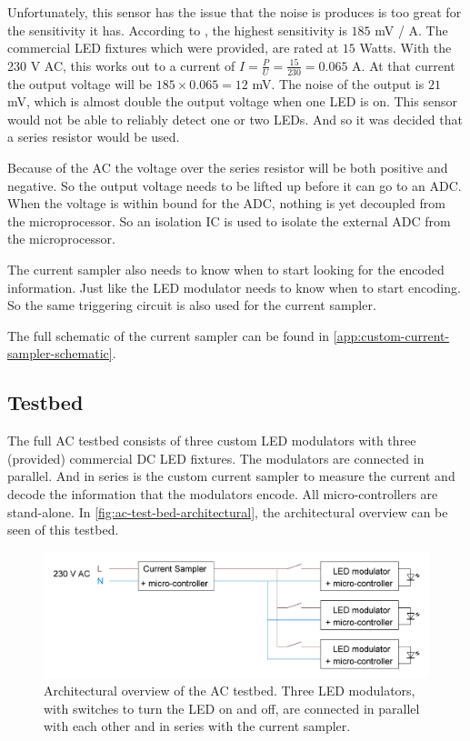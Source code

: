 Unfortunately, this sensor has the issue that the noise is produces is too great for the sensitivity it has.
According to \cite{hall-ac-current-sensor-datasheet}, the highest sensitivity is $185$ mV / A.
The commercial LED fixtures which were provided, are rated at $15$ Watts.
With the 230 V AC, this works out to a current of $I = \frac{P}{U} = \frac{15}{230} = 0.065$ A.
At that current the output voltage will be $185 \times 0.065 = 12$ mV.
The noise of the output is $21$ mV, which is almost double the output voltage when one LED is on.
This sensor would not be able to reliably detect one or two LEDs.
And so it was decided that a series resistor would be used.

Because of the AC the voltage over the series resistor will be both positive and negative.
So the output voltage needs to be lifted up before it can go to an ADC.
When the voltage is within bound for the ADC, nothing is yet decoupled from the microprocessor.
So an isolation IC is used to isolate the external ADC from the microprocessor.

The current sampler also needs to know when to start looking for the encoded information.
Just like the LED modulator needs to know when to start encoding.
So the same triggering circuit is also used for the current sampler.

The full schematic of the current sampler can be found in \autoref{app:custom-current-sampler-schematic}.





\subsection{Testbed}

The full AC testbed consists of three custom LED modulators with three (provided) commercial DC LED fixtures.
The modulators are connected in parallel. 
And in series is the custom current sampler to measure the current and decode the information that the modulators encode.
All micro-controllers are stand-alone.
In \autoref{fig:ac-test-bed-architectural}, the architectural overview can be seen of this testbed.

\begin{figure}[htb]
	\centering
	\includegraphics[angle=0,width=\textwidth,keepaspectratio]{chapters/hardware-chapters/ac-test-bed-architectural.JPG}
	\caption{Architectural overview of the AC testbed. Three LED modulators, with switches to turn the LED on and off, are connected in parallel with each other and in series with the current sampler.}
	\label{fig:ac-test-bed-architectural}
\end{figure}



